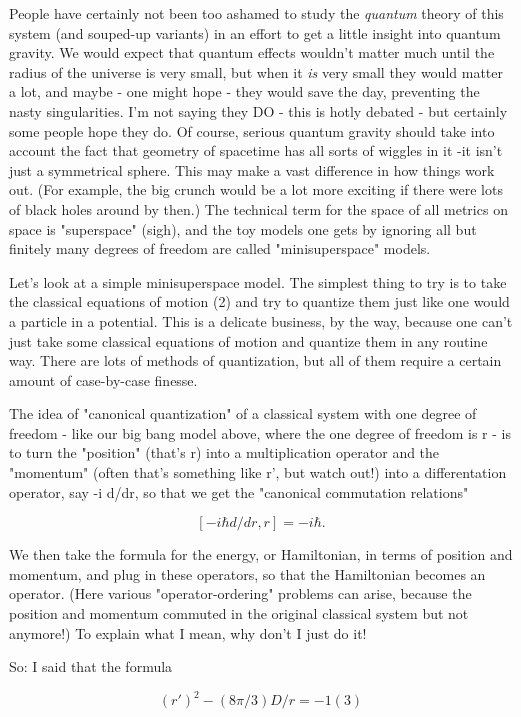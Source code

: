People have certainly not been too ashamed to study the \emph{quantum}
theory of this system (and souped-up variants) in an effort to get a
little insight into quantum gravity.  We would expect that quantum
effects wouldn't matter much until the radius of the universe is very
small, but when it \emph{is} very small they would matter a lot, and maybe -
one might hope - they would save the day, preventing the nasty
singularities.  I'm not saying they DO - this is hotly debated - but
certainly some people hope they do.  Of course, serious quantum gravity
should take into account the fact that geometry of spacetime has all
sorts of wiggles in it -it isn't just a symmetrical sphere.  This may make
a vast difference in how things work out.  (For example, the big crunch
would be a lot more exciting if there were lots of black holes around by
then.)   The technical term for the space of all metrics on space is
"superspace" (sigh), and the toy models one gets by ignoring all but
finitely many degrees of freedom are called "minisuperspace" models. 

Let's look at a simple minisuperspace model.  The simplest thing
to try is to take the classical equations of motion (2) and try to
quantize them just like one would a particle in a potential.  This is a
delicate business, by the way, because one can't just take some
classical equations of motion and quantize them in any routine way.  
There are lots of methods of quantization, but all of them require a
certain amount of case-by-case finesse.

The idea of "canonical quantization" of a classical system with one
degree of freedom - like our big bang model above, where the one degree
of freedom is r  - is to turn the "position" (that's r) into a
multiplication operator and the "momentum" (often that's something like
r', but watch out!) into a differentation operator, say -i \hbar  d/dr, so that
we get the "canonical commutation relations" 

$$
			[-i \hbar  d/dr, r] = -i \hbar .
$$
    

We then take the formula for the energy, or Hamiltonian, in terms of
position and momentum, and plug in these operators, so that the
Hamiltonian becomes an operator.  (Here various "operator-ordering"
problems can arise, because the position and momentum commuted in the
original classical system but not anymore!)   To explain what I mean,
why don't I just do it!

So: I said that the formula 

$$
  (r')^{2} - (8\pi /3) D/r = - 1  						(3)
$$
    

